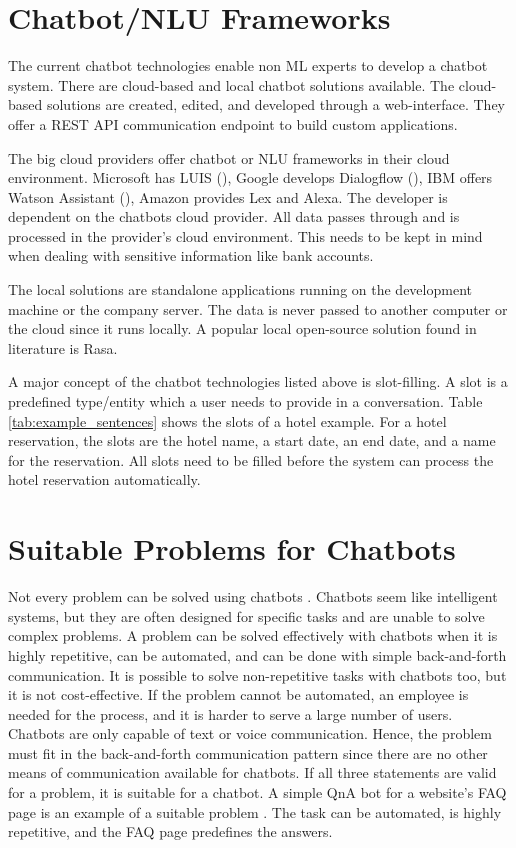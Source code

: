 \section{Chatbot/NLU Frameworks}
The current chatbot technologies enable non ML experts to develop a chatbot system.
There are cloud-based and local chatbot solutions available.
The cloud-based solutions are created, edited, and developed through a web-interface. 
They offer a REST API communication endpoint to build custom applications.

The big cloud providers offer chatbot or NLU frameworks in their cloud environment.
Microsoft has LUIS (\citet{luis2015williams, luisdocs}),
Google develops Dialogflow (\citet{dialogflow}),
IBM offers Watson Assistant (\citet{watsonassistant}),
Amazon provides Lex and Alexa.
The developer is dependent on the chatbots cloud provider.
All data passes through and is processed in the provider's cloud environment.
This needs to be kept in mind when dealing with sensitive information like bank accounts.

The local solutions are standalone applications running on the development machine or the company server.
The data is never passed to another computer or the cloud since it runs locally.
A popular local open-source solution found in literature is Rasa\citet{rasabocklisch2017,rasa}. 

A major concept of the chatbot technologies listed above is slot-filling.
A slot is a predefined type/entity which a user needs to provide in a conversation.
Table \ref{tab:example_sentences} shows the slots of a hotel example.
For a hotel reservation, the slots are the hotel name, a start date, an end date, and a name for the reservation.
All slots need to be filled before the system can process the hotel reservation automatically.

\section{Suitable Problems for Chatbots} 
Not every problem can be solved using chatbots \cite{buiildChatbotsPython}.
Chatbots seem like intelligent systems, but they are often designed for specific tasks and are unable to solve complex problems.
A problem can be solved effectively with chatbots when it is highly repetitive, can be automated, and can be done with simple back-and-forth communication.
It is possible to solve non-repetitive tasks with chatbots too, but it is not cost-effective.
If the problem cannot be automated, an employee is needed for the process, and it is harder to serve a large number of users.
Chatbots are only capable of text or voice communication.
Hence, the problem must fit in the back-and-forth communication pattern since there are no other means of communication available for chatbots.
If all three statements are valid for a problem, it is suitable for a chatbot.
A simple QnA bot for a website's FAQ page is an example of a suitable problem \cite{buiildChatbotsPython}.
The task can be automated, is highly repetitive, and the FAQ page predefines the answers.

